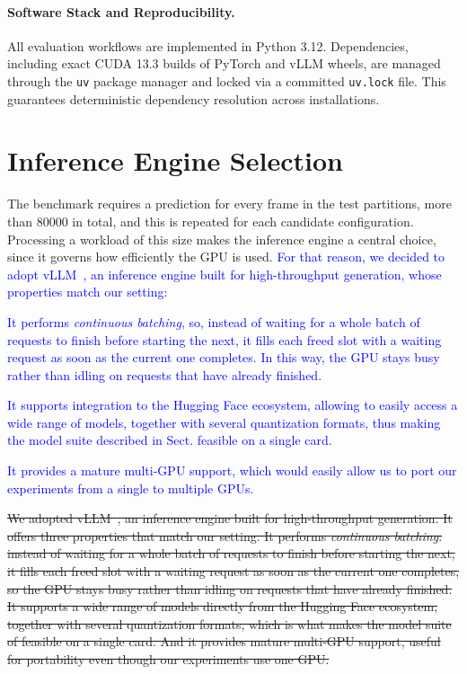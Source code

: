 \paragraph{Software Stack and Reproducibility.}
All evaluation workflows are implemented in Python 3.12. Dependencies, including exact CUDA 13.3 builds of PyTorch and vLLM wheels, are managed through the \texttt{uv} package manager and locked via a committed \texttt{uv.lock} file. This guarantees deterministic dependency resolution across installations.


\section{Inference Engine Selection}
\label{sec:engine}

The benchmark requires a prediction for every frame in the test partitions, more than \num{80000} in total, and this is repeated for each candidate configuration. Processing a workload of this size makes the inference engine a central choice, since it governs how efficiently the GPU is used. 
\textcolor{blue}{For that reason, we decided to adopt vLLM~\cite{vllm}, an inference engine built for high-throughput generation, whose properties match our setting:}
\begin{itemize}
    \item \textcolor{blue}{It performs \emph{continuous batching}, so, instead of waiting for a whole batch of requests to finish before starting the next, it fills each freed slot with a waiting request as soon as the current one completes. In this way, the GPU stays busy rather than idling on requests that have already finished. 
    \item It supports integration to the Hugging Face ecosystem, allowing to easily access a wide range of models, together with several quantization formats, thus making the model suite described in Sect.  feasible on a single card. 
    \item It provides a mature multi-GPU support, which would easily allow us to port our experiments from a single to multiple GPUs. }
\end{itemize}


\sout{We adopted vLLM~\cite{vllm}, an inference engine built for high-throughput generation. It offers three properties that match our setting. It performs \emph{continuous batching}: instead of waiting for a whole batch of requests to finish before starting the next, it fills each freed slot with a waiting request as soon as the current one completes, so the GPU stays busy rather than idling on requests that have already finished. It supports a wide range of models directly from the Hugging Face ecosystem, together with several quantization formats, which is what makes the model suite of  feasible on a single card. And it provides mature multi-GPU support, useful for portability even though our experiments use one GPU.}

